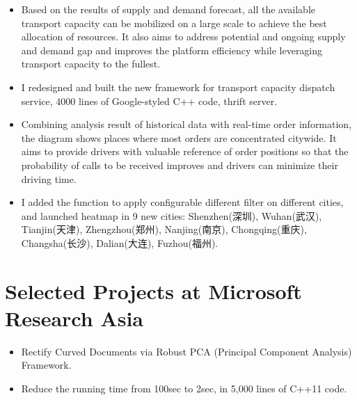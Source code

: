 \documentclass{resume}
\begin{document}
 \begin{itemize}
    \item Based on the results of supply and demand forecast, 
          all the available transport capacity can be mobilized on a large scale to achieve the best allocation of resources. 
          It also aims to address potential and ongoing supply and demand gap and 
          improves the platform efficiency while leveraging transport capacity to the fullest.
    \item I redesigned and built the new framework for transport capacity dispatch service, 4000 lines of Google-styled C++ code, thrift server.
 \end{itemize}

 \begin{itemize}
    \item Combining analysis result of historical data with real-time order information, 
          the diagram shows places where most orders are concentrated citywide. 
          It aims to provide drivers with valuable reference of order positions 
          so that the probability of calls to be received improves and drivers can minimize their driving time.
    \item I added the function to apply configurable different filter on different cities, 
          and launched heatmap in 9 new cities: 
          Shenzhen(深圳), Wuhan(武汉), Tianjin(天津), Zhengzhou(郑州), Nanjing(南京), 
          Chongqing(重庆), Changsha(长沙), Dalian(大连), Fuzhou(福州).
 \end{itemize}

\section{Selected Projects at Microsoft Research Asia}
 \begin{itemize}
    \item Rectify Curved Documents via Robust PCA (Principal Component Analysis) Framework.
    \item Reduce the running time from 100sec to 2sec, in 5,000 lines of C++11 code.
 \end{itemize}
\end{document}
